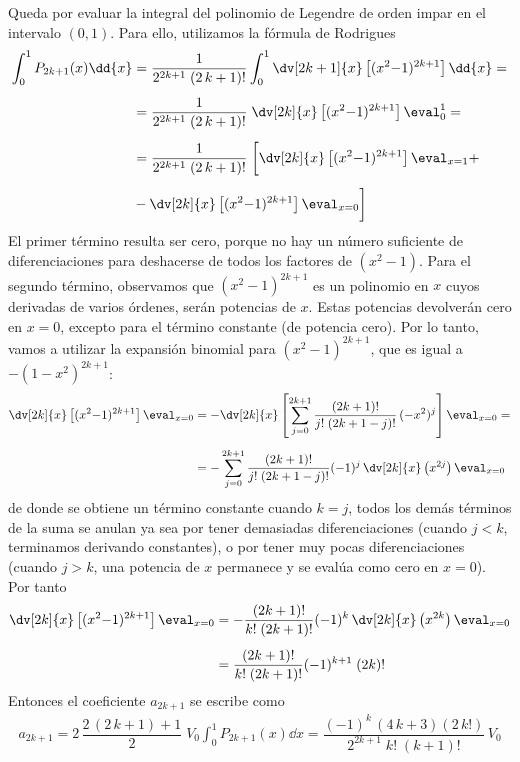 Queda por evaluar la integral del polinomio de Legendre de orden impar en el intervalo $(0, 1)$. Para ello, utilizamos la fórmula de Rodrigues
\begin{align*}
\int_{0}^{1} P_{2k+1} (x) \dd{x} &= \dfrac{1}{2^{2k+1} \; (2 \, k +1)!} \int_{0}^{1} \dv[2k+1]{x} \left[ (x^{2} {-} 1)^{2k+1} \right] \dd{x} = \\[0.5em]
&= \dfrac{1}{2^{2k+1} \; (2 \, k +1)!} \; \dv[2k]{x} \left[ (x^{2} {-} 1)^{2k+1} \right] \eval_{0}^{1} = \\[0.5em]
&= \dfrac{1}{2^{2k+1} \; (2 \, k +1)!} \; \bigg[ \dv[2k]{x} \left[ (x^{2} {-} 1)^{2k+1} \right] \eval_{x=1} + \\[0.5em]
&- \dv[2k]{x} \left[ (x^{2} {-} 1)^{2k+1} \right] \eval_{x=0} \bigg]
\end{align*}
El primer término resulta ser cero, porque no hay un número suficiente de diferenciaciones para deshacerse de todos los factores de $(x^{2} - 1)$. Para el segundo término, observamos que $(x^{2} - 1)^{2k + 1}$ es un polinomio en $x$ cuyos derivadas de varios órdenes, serán potencias de $x$. Estas potencias devolverán cero en $x = 0$, excepto para el término constante (de potencia cero). Por lo tanto, vamos a utilizar la expansión binomial para $(x^{2} - 1)^{2k + 1}$, que es igual a $-(1 {-} x^{2})^{2k + 1}$:
\begin{align*}
\dv[2k]{x} \left[ (x^{2} {-} 1)^{2k+1} \right] \eval_{x=0} &= - \dv[2k]{x} \left[ \sum_{j=0}^{2k+1} \dfrac{(2k+1)!}{j! \; (2k + 1 - j)!} \, (-x^{2})^{j} \right] \eval_{x=0} = \\[0.5em]
&= - \sum_{j=0}^{2k+1} \dfrac{(2k+1)!}{j! \; (2k + 1 - j)!} (-1)^{j} \, \dv[2k]{x} \left( x^{2j} \right) \eval_{x=0}
\end{align*}
de donde se obtiene un término constante cuando $k = j$, todos los demás términos de la suma se anulan ya sea por tener  demasiadas diferenciaciones (cuando $j < k$, terminamos derivando constantes), o por tener muy pocas diferenciaciones (cuando $j > k$, una potencia de $x$ permanece y se evalúa como cero en $x = 0$). Por tanto
\begin{align*}
\dv[2k]{x} \left[ (x^{2} {-} 1)^{2k+1} \right] \eval_{x=0} &= - \dfrac{(2k+1)!}{k! \; (2k + 1)!} (-1)^{k} \, \dv[2k]{x} \left( x^{2k} \right) \eval_{x=0} \\[0.5em]
&= \dfrac{(2k+1)!}{k! \; (2k + 1)!} (-1)^{k+1} \; (2k)!
\end{align*}
Entonces el coeficiente $a_{2k+1}$ se escribe como
\begin{align*}
a_{2k+1} = 2 \, \dfrac{2 \, (2 \, k + 1) + 1}{2} \; V_{0} \int_{0}^{1} P_{2k+1} (x) \dd{x} = \dfrac{(-1)^{k} \, (4 \, k + 3)(2 \, k!)}{2^{2k+1} \; k! \; (k+1)!} \, V_{0}
\end{align*}

